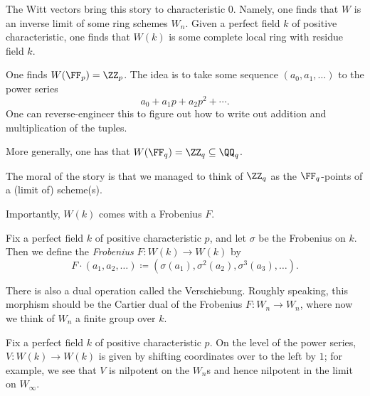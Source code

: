 \documentclass[../notes.tex]{subfiles}
\begin{document}
The Witt vectors bring this story to characteristic $0$. Namely, one finds that $W$ is an inverse limit of some ring schemes $W_n$. Given a perfect field $k$ of positive characteristic, one finds that $W(k)$ is some complete local ring with residue field $k$.
\begin{example}
	One finds $W(\FF_p)=\ZZ_p$. The idea is to take some sequence $(a_0,a_1,\ldots)$ to the power series
	\[a_0+a_1p+a_2p^2+\cdots.\]
	One can reverse-engineer this to figure out how to write out addition and multiplication of the tuples.
\end{example}
\begin{example}
	More generally, one has that $W(\FF_q)=\ZZ_q\subseteq\QQ_q$.
\end{example}
The moral of the story is that we managed to think of $\ZZ_q$ as the $\FF_q$-points of a (limit of) scheme(s).

Importantly, $W(k)$ comes with a Frobenius $F$.
\begin{definition}
	Fix a perfect field $k$ of positive characteristic $p$, and let $\sigma$ be the Frobenius on $k$. Then we define the \textit{Frobenius} $F\colon W(k)\to W(k)$ by
	\[F\cdot(a_1,a_2,\ldots)\coloneqq\left(\sigma(a_1),\sigma^2(a_2),\sigma^3(a_3),\ldots\right).\]
\end{definition}
There is also a dual operation called the Verschiebung. Roughly speaking, this morphism should be the Cartier dual of the Frobenius $F\colon W_n\to W_n$, where now we think of $W_n$ a finite group over $k$.
\begin{definition}
	Fix a perfect field $k$ of positive characteristic $p$. On the level of the power series, $V\colon W(k)\to W(k)$ is given by shifting coordinates over to the left by $1$; for example, we see that $V$ is nilpotent on the $W_n$s and hence nilpotent in the limit on $W_\infty$.
\end{definition}
\end{document}
